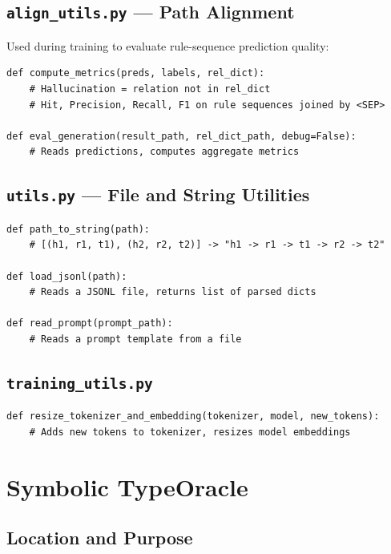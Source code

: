 \documentclass[11pt,a4paper,oneside,openany]{book}
\theoremstyle{definition}
\begin{document}
\section{\texttt{align\_utils.py} --- Path Alignment}

Used during training to evaluate rule-sequence prediction quality:

\begin{lstlisting}
def compute_metrics(preds, labels, rel_dict):
    # Hallucination = relation not in rel_dict
    # Hit, Precision, Recall, F1 on rule sequences joined by <SEP>

def eval_generation(result_path, rel_dict_path, debug=False):
    # Reads predictions, computes aggregate metrics
\end{lstlisting}

\section{\texttt{utils.py} --- File and String Utilities}

\begin{lstlisting}
def path_to_string(path):
    # [(h1, r1, t1), (h2, r2, t2)] -> "h1 -> r1 -> t1 -> r2 -> t2"

def load_jsonl(path):
    # Reads a JSONL file, returns list of parsed dicts

def read_prompt(prompt_path):
    # Reads a prompt template from a file
\end{lstlisting}

\section{\texttt{training\_utils.py}}

\begin{lstlisting}
def resize_tokenizer_and_embedding(tokenizer, model, new_tokens):
    # Adds new tokens to tokenizer, resizes model embeddings
\end{lstlisting}

\chapter{Symbolic TypeOracle}\label{ch:typeoracle}

\section{Location and Purpose}
\end{document}
